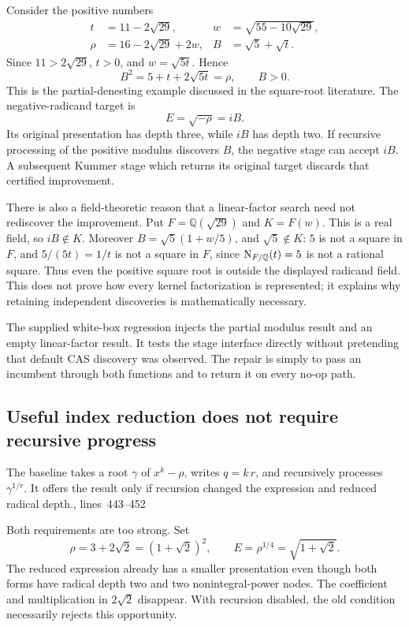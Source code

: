 \documentclass[11pt,a4paper]{article}
\newcommand{\Q}{\mathbb Q}\newcommand{\C}{\mathbb C}
\newcommand{\src}[1]{\cite{source}, lines~#1}
\theoremstyle{definition}\newtheorem{definition}[proposition]{Definition}
\theoremstyle{remark}\newtheorem{remark}[proposition]{Remark}
\begin{document}
Consider the positive numbers
\begin{align}
 t&=11-2\sqrt{29}, & w&=\sqrt{55-10\sqrt{29}},\\
 \rho&=16-2\sqrt{29}+2w, & B&=\sqrt5+\sqrt t.
\end{align}
Since $11>2\sqrt{29}$, $t>0$, and $w=\sqrt{5t}$. Hence
\begin{equation}\label{eq:partial}
 B^2=5+t+2\sqrt{5t}=\rho,\qquad B>0.
\end{equation}
This is the partial-denesting example discussed in the square-root
literature.\cite{bfht} The negative-radicand target is
\begin{equation}
 E=\sqrt{-\rho}=iB.
\end{equation}
Its original presentation has depth three, while $iB$ has depth two.
If recursive processing of the positive modulus discovers $B$, the negative
stage can accept $iB$. A subsequent Kummer stage which returns its original
target discards that certified improvement.

There is also a field-theoretic reason that a linear-factor search need not
rediscover the improvement. Put $F=\Q(\sqrt{29})$ and $K=F(w)$. This is a real
field, so $iB\notin K$. Moreover $B=\sqrt5(1+w/5)$, and $\sqrt5\notin K$:
$5$ is not a square in $F$, and $5/(5t)=1/t$ is not a square in $F$, since
$\Nrm_{F/\Q}(t)=5$ is not a rational square. Thus even the positive square root
is outside the displayed radicand field. This does not prove how every kernel
factorization is represented; it explains why retaining independent discoveries
is mathematically necessary.

The supplied white-box regression injects the partial modulus result and an
empty linear-factor result. It tests the stage interface directly without
pretending that default CAS discovery was observed. The repair is simply to
pass an incumbent through both functions and to return it on every no-op path.

\subsection{Useful index reduction does not require recursive progress}
The baseline takes a root $\gamma$ of $x^k-\rho$, writes $q=k\,r$, and recursively
processes $\gamma^{1/r}$. It offers the result only if recursion changed the
expression and reduced radical depth.\src{443--452}

Both requirements are too strong. Set
\begin{equation}\label{eq:index-witness}
 \rho=3+2\sqrt2=(1+\sqrt2)^2,\qquad
 E=\rho^{1/4}=\sqrt{1+\sqrt2}.
\end{equation}
The reduced expression already has a smaller presentation even though both
forms have radical depth two and two nonintegral-power nodes. The coefficient
and multiplication in $2\sqrt2$ disappear. With recursion disabled, the old
condition necessarily rejects this opportunity.
\end{document}
